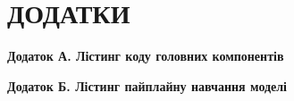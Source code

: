 \chapter*{ДОДАТКИ}

\textbf{Додаток А. Лістинг коду головних компонентів}

\textbf{Додаток Б. Лістинг пайплайну навчання моделі}
